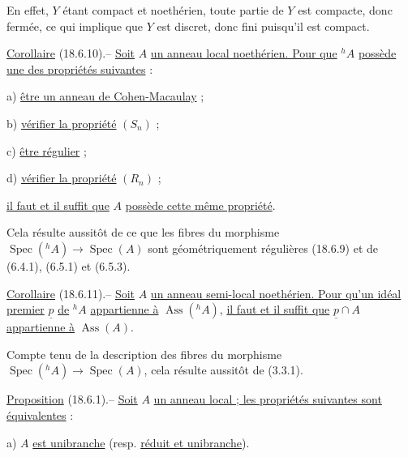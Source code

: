 
En effet, $Y$ étant compact  et noethérien, toute partie de $Y$ est compacte, donc fermée, ce qui implique que $Y$ est discret, donc fini puisqu'il est compact.

\uline{Corollaire} (18.6.10).-- \uline{Soit} $A$ \uline{un anneau local noethérien. Pour que} ${}^h A$ \uline{possède une des propriétés suivantes} :

a) \uline{être un anneau de Cohen-Macaulay} ;

b) \uline{vérifier la propriété} $(S_n)$ ;

c) \uline{être régulier} ;

d) \uline{vérifier la propriété} $(R_n)$ ;


\uline{il faut et il suffit que} $A$ \uline{possède cette même propriété}.

Cela résulte aussitôt de ce que les fibres du morphisme $\operatorname{Spec}({}^h A)\to\operatorname{Spec}(A)$ sont géométriquement régulières (18.6.9) et de (6.4.1), (6.5.1) et (6.5.3).

\uline{Corollaire} (18.6.11).-- \uline{Soit} $A$ \uline{un anneau semi-local noethérien. Pour qu'un idéal premier} $\underline p$ \uline{de} ${}^h A$ \uline{appartienne à} $\operatorname{Ass}({}^h A)$, \uline{il faut et il suffit que} $\underline p\cap A$ \uline{appartienne à} $\operatorname{Ass}(A)$.

Compte tenu de la description des fibres du morphisme $\operatorname{Spec}({}^h A)\to\operatorname{Spec}(A)$, cela résulte aussitôt de (3.3.1).

\uline{Proposition} (18.6.1).-- \uline{Soit} $A$ \uline{un anneau local ; les propriétés suivantes sont équivalentes} :

a) $A$ \uline{est unibranche} (resp. \uline{réduit et unibranche}).


